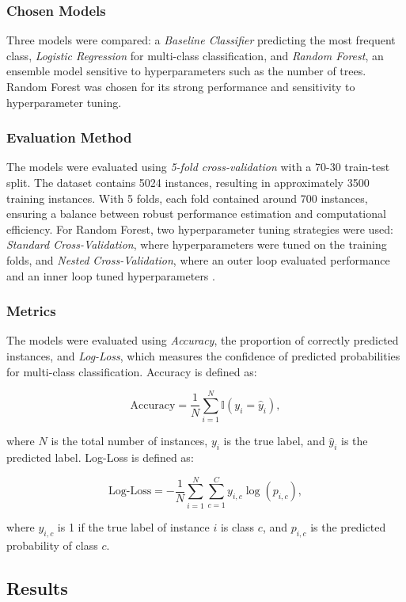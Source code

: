 \documentclass[fleqn,moreauthors,10pt]{ds_report}
\begin{document}
\subsubsection*{Chosen Models}
Three models were compared: a \textit{Baseline Classifier} predicting the most frequent class, \textit{Logistic Regression} for multi-class classification, and \textit{Random Forest}, an ensemble model sensitive to hyperparameters such as the number of trees. Random Forest was chosen for its strong performance and sensitivity to hyperparameter tuning.

\subsubsection*{Evaluation Method}
The models were evaluated using \textit{5-fold cross-validation} with a 70-30 train-test split. The dataset contains 5024 instances, resulting in approximately 3500 training instances. With 5 folds, each fold contained around 700 instances, ensuring a balance between robust performance estimation and computational efficiency. For Random Forest, two hyperparameter tuning strategies were used: \textit{Standard Cross-Validation}, where hyperparameters were tuned on the training folds, and \textit{Nested Cross-Validation}, where an outer loop evaluated performance and an inner loop tuned hyperparameters \cite{ESL}.

\subsubsection*{Metrics}
The models were evaluated using \textit{Accuracy}, the proportion of correctly predicted instances, and \textit{Log-Loss}, which measures the confidence of predicted probabilities for multi-class classification. Accuracy is defined as:

\[
\text{Accuracy} = \frac{1}{N} \sum_{i=1}^N \mathbb{I}(y_i = \hat{y}_i),
\]

where \( N \) is the total number of instances, \( y_i \) is the true label, and \( \hat{y}_i \) is the predicted label. Log-Loss is defined as:

\[
\text{Log-Loss} = -\frac{1}{N} \sum_{i=1}^N \sum_{c=1}^C y_{i,c} \log(p_{i,c}),
\]

where \( y_{i,c} \) is 1 if the true label of instance \( i \) is class \( c \), and \( p_{i,c} \) is the predicted probability of class \( c \).


\subsection*{Results}
\end{document}
